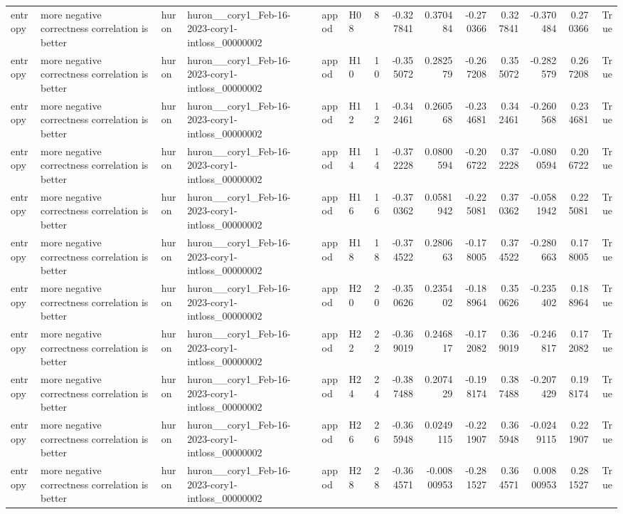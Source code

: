 \begin{longtable}{llllllrrrrrrrr}
entropy & more negative correctness correlation is better & huron & huron\_\_cory1\_Feb-16-2023-cory1-intloss\_00000002 & appod & H08 & 8 & -0.327841 & 0.370484 & -0.270366 & 0.327841 & -0.370484 & 0.270366 & True \\
entropy & more negative correctness correlation is better & huron & huron\_\_cory1\_Feb-16-2023-cory1-intloss\_00000002 & appod & H10 & 10 & -0.355072 & 0.282579 & -0.267208 & 0.355072 & -0.282579 & 0.267208 & True \\
entropy & more negative correctness correlation is better & huron & huron\_\_cory1\_Feb-16-2023-cory1-intloss\_00000002 & appod & H12 & 12 & -0.342461 & 0.260568 & -0.234681 & 0.342461 & -0.260568 & 0.234681 & True \\
entropy & more negative correctness correlation is better & huron & huron\_\_cory1\_Feb-16-2023-cory1-intloss\_00000002 & appod & H14 & 14 & -0.372228 & 0.0800594 & -0.206722 & 0.372228 & -0.0800594 & 0.206722 & True \\
entropy & more negative correctness correlation is better & huron & huron\_\_cory1\_Feb-16-2023-cory1-intloss\_00000002 & appod & H16 & 16 & -0.370362 & 0.0581942 & -0.225081 & 0.370362 & -0.0581942 & 0.225081 & True \\
entropy & more negative correctness correlation is better & huron & huron\_\_cory1\_Feb-16-2023-cory1-intloss\_00000002 & appod & H18 & 18 & -0.374522 & 0.280663 & -0.178005 & 0.374522 & -0.280663 & 0.178005 & True \\
entropy & more negative correctness correlation is better & huron & huron\_\_cory1\_Feb-16-2023-cory1-intloss\_00000002 & appod & H20 & 20 & -0.350626 & 0.235402 & -0.188964 & 0.350626 & -0.235402 & 0.188964 & True \\
entropy & more negative correctness correlation is better & huron & huron\_\_cory1\_Feb-16-2023-cory1-intloss\_00000002 & appod & H22 & 22 & -0.369019 & 0.246817 & -0.172082 & 0.369019 & -0.246817 & 0.172082 & True \\
entropy & more negative correctness correlation is better & huron & huron\_\_cory1\_Feb-16-2023-cory1-intloss\_00000002 & appod & H24 & 24 & -0.387488 & 0.207429 & -0.198174 & 0.387488 & -0.207429 & 0.198174 & True \\
entropy & more negative correctness correlation is better & huron & huron\_\_cory1\_Feb-16-2023-cory1-intloss\_00000002 & appod & H26 & 26 & -0.365948 & 0.0249115 & -0.221907 & 0.365948 & -0.0249115 & 0.221907 & True \\
entropy & more negative correctness correlation is better & huron & huron\_\_cory1\_Feb-16-2023-cory1-intloss\_00000002 & appod & H28 & 28 & -0.364571 & -0.00800953 & -0.281527 & 0.364571 & 0.00800953 & 0.281527 & True \\

\end{longtable}

